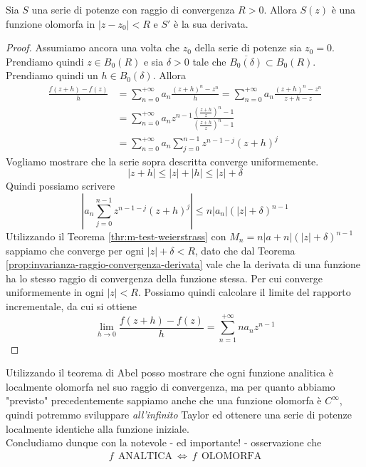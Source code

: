 \begin{theorem}
	\label{thr:teorema-di-abel}
	Sia $S$ una serie di potenze con raggio di convergenza $R > 0$. Allora $S(z)$ è una funzione olomorfa in $|z-z_0| < R$ e $S'$ è la sua derivata.
\end{theorem}
\begin{proof}
	Assumiamo ancora una volta che $z_0$ della serie di potenze sia $z_0 = 0$. Prendiamo quindi $z \in B_0(R)$ e sia $\delta > 0$ tale che $\overline{B_0(\delta)} \subset B_0(R)$. Prendiamo quindi un $h \in B_0(\delta)$. Allora
	\begin{equation*}
	\begin{aligned}
		\frac{f(z+h) - f(z)}{h} & = \sum^{+\infty}_{n=0} a_n \frac{(z+h)^n - z^n}{h} = \sum^{+\infty}_{n=0} a_n \frac{(z+h)^n-z^n}{z+h-z} \\
								& = \sum^{+\infty}_{n=0} a_n z^{n-1} \frac{\left(\frac{z+h}{z}\right)^n - 1}{\left(\frac{z+h}{z}\right)^n - 1} \\
								& = \sum^{+\infty}_{n=0} a_n \sum^{n-1}_{j=0} z^{n-1-j}(z+h)^j 
	\end{aligned}
	\end{equation*}
	Vogliamo mostrare che la serie sopra descritta converge uniformemente.
	\begin{equation*}
		|z+h| \le |z| + |h| \le |z| + \delta
	\end{equation*}
	Quindi possiamo scrivere 
	\begin{equation*}
		\left|a_n \sum^{n-1}_{j=0} z^{n-1-j}(z+h)^j \right| \le n|a_n|(|z|+\delta)^{n-1} 
	\end{equation*}
	Utilizzando il Teorema \ref{thr:m-test-weierstrass} con $M_n = n|a+n|(|z|+\delta)^{n-1}$ sappiamo che converge per ogni $|z|+\delta < R$, dato che dal Teorema \ref{prop:invarianza-raggio-convergenza-derivata} vale che la derivata di una funzione ha lo stesso raggio di convergenza della funzione stessa. Per cui converge uniformemente in ogni $|z| < R$. 
	Possiamo quindi calcolare il limite del rapporto incrementale, da cui si ottiene 
	\begin{equation*}
		\lim_{h\to 0} \frac{f(z+h) - f(z)}{h} = \sum^{+\infty}_{n=1} na_nz^{n-1}
	\end{equation*}
\end{proof}

\begin{remark}
	Utilizzando il teorema di Abel posso mostrare che ogni funzione analitica è localmente olomorfa nel suo raggio di convergenza, ma per quanto abbiamo "previsto" precedentemente sappiamo anche che una funzione olomorfa è $C^\infty$, quindi potremmo sviluppare \textit{all'infinito} Taylor ed ottenere una serie di potenze localmente identiche alla funzione iniziale. \\ Concludiamo dunque con la notevole - ed importante! - osservazione che
	\begin{equation*}
	\begin{aligned}
		f \ \ \textrm{ANALTICA} \ \Longleftrightarrow \ f \ \  \mathrm{OLOMORFA}
	\end{aligned}
	\end{equation*}
\end{remark}
